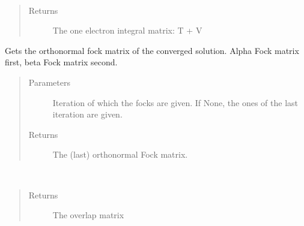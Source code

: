 \documentclass[letterpaper,10pt,english]{sphinxmanual}
\begin{document}
\begin{fulllineitems}
\begin{fulllineitems}
\begin{quote}
\begin{description}
\end{description}\end{quote}

\end{fulllineitems}


\begin{fulllineitems}
\label{\detokenize{cUHF_b:hf.HartreeFock.cUHF_b.MF.get_one_e}}~\begin{quote}\begin{description}
\item[{Returns}] \leavevmode
The one electron integral matrix: T + V

\end{description}\end{quote}

\end{fulllineitems}


\begin{fulllineitems}
\label{\detokenize{cUHF_b:hf.HartreeFock.cUHF_b.MF.get_orth_fock}}
Gets the orthonormal fock matrix of the converged solution.
Alpha Fock matrix first, beta Fock matrix second.
\begin{quote}\begin{description}
\item[{Parameters}] \leavevmode
{} \textendash{} Iteration of which the focks are given. If None, the ones of the last iteration are given.

\item[{Returns}] \leavevmode
The (last) orthonormal Fock matrix.

\end{description}\end{quote}

\end{fulllineitems}


\begin{fulllineitems}
\label{\detokenize{cUHF_b:hf.HartreeFock.cUHF_b.MF.get_ovlp}}~\begin{quote}\begin{description}
\item[{Returns}] \leavevmode
The overlap matrix


\end{description}
\end{quote}
\end{fulllineitems}
\end{fulllineitems}
\end{document}
